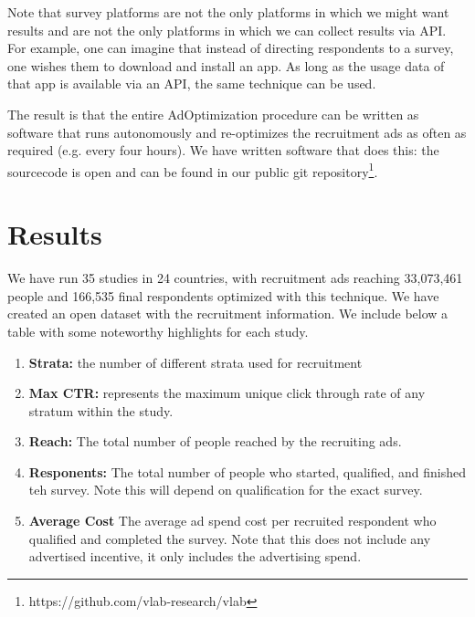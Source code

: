 \documentclass[a4paper,12pt]{article}
\theoremstyle{proposition}
\begin{document}
Note that survey platforms are not the only platforms in which we might want results and are not the only platforms in which we can collect results via API. For example, one can imagine that instead of directing respondents to a survey, one wishes them to download and install an app. As long as the usage data of that app is available via an API, the same technique can be used.

The result is that the entire AdOptimization procedure can be written as software that runs autonomously and re-optimizes the recruitment ads as often as required (e.g. every four hours). We have written software that does this: the sourcecode is open and can be found in our public git repository\footnote{https://github.com/vlab-research/vlab}.


\section{Results}

We have run 35 studies in 24 countries, with recruitment ads reaching 33,073,461 people and 166,535 final respondents optimized with this technique. We have created an open dataset with the recruitment information. We include below a table with some noteworthy highlights for each study.

\begin{enumerate}
\item \textbf{Strata:} the number of different strata used for recruitment
\item  \textbf{Max CTR:} represents the maximum unique click through rate of any stratum within the study.
\item \textbf{Reach:} The total number of people reached by the recruiting ads.
\item \textbf{Responents:} The total number of people who started, qualified, and finished teh survey. Note this will depend on qualification for the exact survey.
\item \textbf{Average Cost} The average ad spend cost per recruited respondent who qualified and completed the survey. Note that this does not include any advertised incentive, it only includes the advertising spend.
\end{enumerate}
\end{document}
